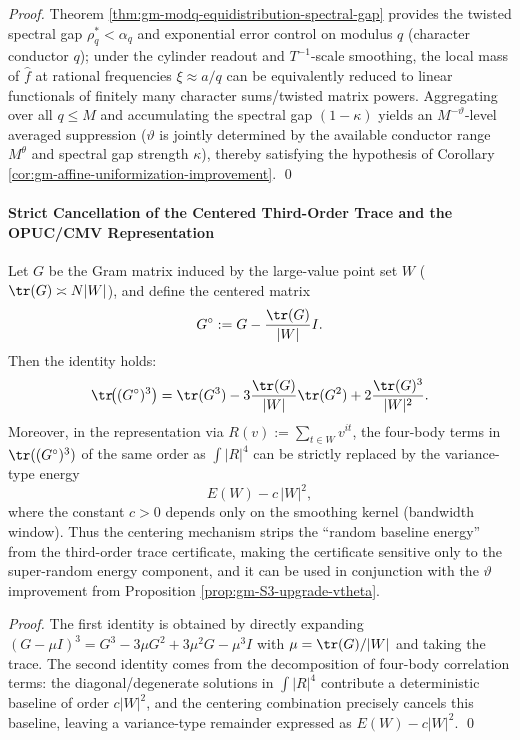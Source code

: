 \begin{proof}
Theorem \ref{thm:gm-modq-equidistribution-spectral-gap} provides the twisted spectral gap \(\rho_q^\ast<\alpha_q\) and exponential error control on modulus \(q\) (character conductor \(q\)); under the cylinder readout and \(T^{-1}\)-scale smoothing, the local mass of \(\widehat f\) at rational frequencies \(\xi\approx a/q\) can be equivalently reduced to linear functionals of finitely many character sums/twisted matrix powers.
Aggregating over all \(q\le M\) and accumulating the spectral gap \((1-\kappa)\) yields an \(M^{-\vartheta}\)-level averaged suppression (\(\vartheta\) is jointly determined by the available conductor range \(M^\theta\) and spectral gap strength \(\kappa\)), thereby satisfying the hypothesis of Corollary \ref{cor:gm-affine-uniformization-improvement}. \qed
\end{proof}

\paragraph{Strict Cancellation of the Centered Third-Order Trace and the OPUC/CMV Representation}
\begin{proposition}\label{prop:gm-centered-trace3-energy-variance}
Let \(G\) be the Gram matrix induced by the large-value point set \(W\) (\(\tr(G)\asymp N|W|\)), and define the centered matrix
\[
G^\circ:=G-\frac{\tr(G)}{|W|}I.
\]
Then the identity holds:
\[
\tr\!\bigl((G^\circ)^3\bigr)
=\tr(G^3)-3\frac{\tr(G)}{|W|}\tr(G^2)+2\frac{\tr(G)^3}{|W|^2}.
\]
Moreover, in the representation via \(R(v):=\sum_{t\in W}v^{it}\), the four-body terms in \(\tr((G^\circ)^3)\) of the same order as \(\int |R|^4\) can be strictly replaced by the variance-type energy
\[
E(W)-c\,|W|^2,
\]
where the constant \(c>0\) depends only on the smoothing kernel (bandwidth window).
Thus the centering mechanism strips the ``random baseline energy'' from the third-order trace certificate, making the certificate sensitive only to the super-random energy component, and it can be used in conjunction with the \(\vartheta\) improvement from Proposition \ref{prop:gm-S3-upgrade-vtheta}.
\end{proposition}

\begin{proof}
The first identity is obtained by directly expanding \((G-\mu I)^3=G^3-3\mu G^2+3\mu^2G-\mu^3I\) with \(\mu=\tr(G)/|W|\) and taking the trace.
The second identity comes from the decomposition of four-body correlation terms: the diagonal/degenerate solutions in \(\int |R|^4\) contribute a deterministic baseline of order \(c|W|^2\), and the centering combination precisely cancels this baseline, leaving a variance-type remainder expressed as \(E(W)-c|W|^2\). \qed
\end{proof}

